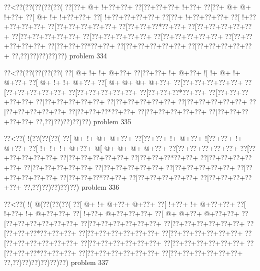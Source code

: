 \vbox{\vbox{\goo
\0??<\0??(\0??(\0??(\0??(\0??(
\0??[\0??+\- @+\- !+\0??+\0??+
\0??[\0??+\0??+\0??+\- !+\0??+
\0??[\0??+\- @+\- @+\- !+\0??+
\0??[\- @+\- !+\- !+\0??+\0??+
\0??[\- !+\0??+\0??+\0??+\0??+
\0??[\0??+\- !+\0??+\0??+\0??+
\0??[\- !+\0??+\0??+\0??+\0??+
\0??[\0??+\0??+\0??+\0??+\0??+
\0??[\0??+\0??+\0??*\0??+\0??+
\0??[\0??+\0??+\0??+\0??+\0??+
\0??[\0??+\0??+\0??+\0??+\0??+
\0??[\0??+\0??+\0??+\0??+\0??+
\0??[\0??+\0??+\0??+\0??+\0??+
\0??[\0??+\0??+\0??+\0??+\0??+
\0??[\0??+\0??+\0??*\0??+\0??+
\0??[\0??+\0??+\0??+\0??+\0??+
\0??[\0??+\0??+\0??+\0??+\0??+
\0??,\0??)\0??)\0??)\0??)\0??)
}
\hfil problem 334\hfil\break
}

\vbox{\vbox{\goo
\0??<\0??(\0??(\0??(\0??(\0??(
\0??[\- @+\- !+\- !+\- @+\0??+
\0??[\0??+\0??+\- !+\- @+\0??+
\- ![\- !+\- @+\- !+\- @+\0??+
\0??[\- @+\- !+\- !+\- @+\0??+
\0??[\- @+\- @+\- @+\- @+\0??+
\0??[\0??+\0??+\0??+\0??+\0??+
\0??[\0??+\0??+\0??+\0??+\0??+
\0??[\0??+\0??+\0??+\0??+\0??+
\0??[\0??+\0??+\0??*\0??+\0??+
\0??[\0??+\0??+\0??+\0??+\0??+
\0??[\0??+\0??+\0??+\0??+\0??+
\0??[\0??+\0??+\0??+\0??+\0??+
\0??[\0??+\0??+\0??+\0??+\0??+
\0??[\0??+\0??+\0??+\0??+\0??+
\0??[\0??+\0??+\0??*\0??+\0??+
\0??[\0??+\0??+\0??+\0??+\0??+
\0??[\0??+\0??+\0??+\0??+\0??+
\0??,\0??)\0??)\0??)\0??)\0??)
}
\hfil problem 335\hfil\break
}

\vbox{\vbox{\goo
\0??<\0??(\- !(\0??(\0??(\0??(
\0??[\- @+\- !+\- @+\- @+\0??+
\0??[\0??+\0??+\- !+\- @+\0??+
\- ![\0??+\0??+\- !+\- @+\0??+
\0??[\- !+\- !+\- !+\- @+\0??+
\- @[\- @+\- @+\- @+\- @+\0??+
\0??[\0??+\0??+\0??+\0??+\0??+
\0??[\0??+\0??+\0??+\0??+\0??+
\0??[\0??+\0??+\0??+\0??+\0??+
\0??[\0??+\0??+\0??*\0??+\0??+
\0??[\0??+\0??+\0??+\0??+\0??+
\0??[\0??+\0??+\0??+\0??+\0??+
\0??[\0??+\0??+\0??+\0??+\0??+
\0??[\0??+\0??+\0??+\0??+\0??+
\0??[\0??+\0??+\0??+\0??+\0??+
\0??[\0??+\0??+\0??*\0??+\0??+
\0??[\0??+\0??+\0??+\0??+\0??+
\0??[\0??+\0??+\0??+\0??+\0??+
\0??,\0??)\0??)\0??)\0??)\0??)
}
\hfil problem 336\hfil\break
}

\vbox{\vbox{\goo
\0??<\0??(\- !(\- @(\0??(\0??(\0??(
\0??[\- @+\- !+\- @+\0??+\- @+\0??+
\0??[\- !+\0??+\- !+\- @+\0??+\0??+
\0??[\- !+\0??+\- !+\- @+\0??+\0??+
\0??[\- !+\0??+\- @+\0??+\0??+\0??+
\0??[\- @+\- @+\0??+\- @+\0??+\0??+
\0??[\0??+\0??+\0??+\0??+\0??+\0??+
\0??[\0??+\0??+\0??+\0??+\0??+\0??+
\0??[\0??+\0??+\0??+\0??+\0??+\0??+
\0??[\0??+\0??+\0??*\0??+\0??+\0??+
\0??[\0??+\0??+\0??+\0??+\0??+\0??+
\0??[\0??+\0??+\0??+\0??+\0??+\0??+
\0??[\0??+\0??+\0??+\0??+\0??+\0??+
\0??[\0??+\0??+\0??+\0??+\0??+\0??+
\0??[\0??+\0??+\0??+\0??+\0??+\0??+
\0??[\0??+\0??+\0??*\0??+\0??+\0??+
\0??[\0??+\0??+\0??+\0??+\0??+\0??+
\0??[\0??+\0??+\0??+\0??+\0??+\0??+
\0??,\0??)\0??)\0??)\0??)\0??)\0??)
}
\hfil problem 337\hfil\break
}

